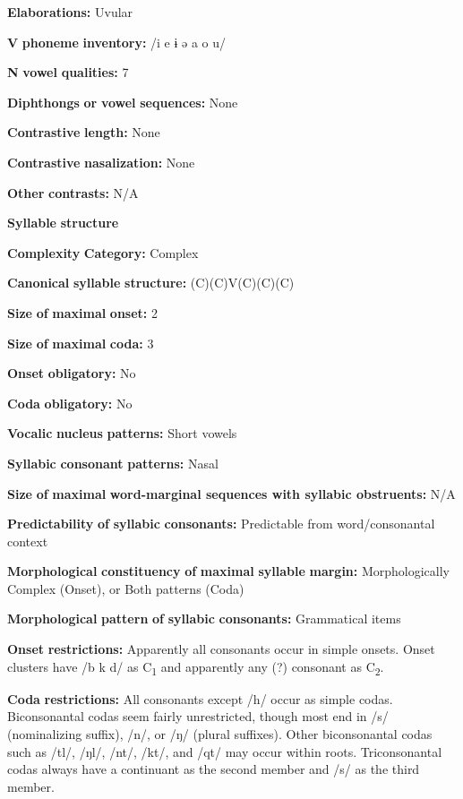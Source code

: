 \textbf{Elaborations:} Uvular

\textbf{V} \textbf{phoneme} \textbf{inventory:} /i e ɨ ə a o u/

\textbf{N} \textbf{vowel} \textbf{qualities:} 7

\textbf{Diphthongs} \textbf{or} \textbf{vowel} \textbf{sequences:} None

\textbf{Contrastive} \textbf{length:} None

\textbf{Contrastive} \textbf{nasalization:} None

\textbf{Other} \textbf{contrasts:} N/A

\textbf{Syllable} \textbf{structure}

\textbf{Complexity} \textbf{Category:} Complex

\textbf{Canonical} \textbf{syllable} \textbf{structure:} (C)(C)V(C)(C)(C) \citep[80-4]{Georg2007}

\textbf{Size} \textbf{of} \textbf{maximal} \textbf{onset:} 2

\textbf{Size} \textbf{of} \textbf{maximal} \textbf{coda:} 3

\textbf{Onset} \textbf{obligatory:} No

\textbf{Coda} \textbf{obligatory:} No

\textbf{Vocalic} \textbf{nucleus} \textbf{patterns:} Short vowels

\textbf{Syllabic} \textbf{consonant} \textbf{patterns:} Nasal

\textbf{Size} \textbf{of} \textbf{maximal} \textbf{word{}-marginal sequences with syllabic obstruents:} N/A

\textbf{Predictability} \textbf{of} \textbf{syllabic} \textbf{consonants:} Predictable from word/consonantal context

\textbf{Morphological} \textbf{constituency} \textbf{of} \textbf{maximal} \textbf{syllable} \textbf{margin:} Morphologically Complex (Onset), or Both patterns (Coda)

\textbf{Morphological} \textbf{pattern} \textbf{of} \textbf{syllabic} \textbf{consonants:} Grammatical items

\textbf{Onset} \textbf{restrictions:} Apparently all consonants occur in simple onsets. Onset clusters have /b k d/ as C\textsubscript{1} and apparently any (?) consonant as C\textsubscript{2}.

\textbf{Coda} \textbf{restrictions:} All consonants except /h/ occur as simple codas. Biconsonantal codas seem fairly unrestricted, though most end in /s/ (nominalizing suffix), /n/, or /ŋ/ (plural suffixes). Other biconsonantal codas such as /tl/, /ŋl/, /nt/, /kt/, and /qt/ may occur within roots. Triconsonantal codas always have a continuant as the second member and /s/ as the third member.

